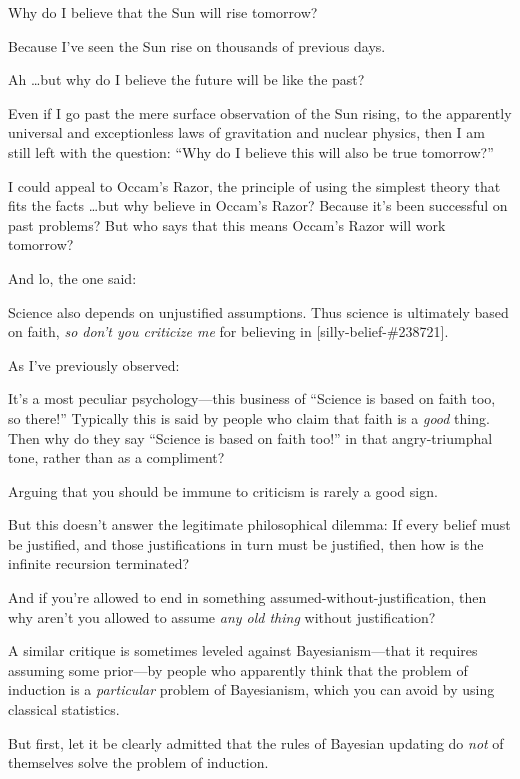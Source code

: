 {
 Why do I believe that the Sun will rise tomorrow? }

{
 Because I've seen the Sun rise on thousands of
previous days.}

{
 Ah \ldots but why do I believe the future will be like the past?}

{
 Even if I go past the mere surface observation of the Sun rising,
to the apparently universal and exceptionless laws of gravitation and
nuclear physics, then I am still left with the question:
``Why do I believe this will also be true
tomorrow?''}

{
 I could appeal to Occam's Razor, the principle of
using the simplest theory that fits the facts \ldots but why believe in
Occam's Razor? Because it's been
successful on past problems? But who says that this means
Occam's Razor will work tomorrow?}

{
 And lo, the one said:}

{
 Science also depends on unjustified assumptions. Thus science is
ultimately based on faith, \textit{so don't you
criticize me} for believing in [silly-belief-\#238721].}

{
 As I've previously observed:}

{
 It's a most peculiar psychology---this business of
``Science is based on faith too, so
there!'' Typically this is said by people who claim
that faith is a \textit{good} thing. Then why do they say
``Science is based on faith too!''
in that angry-triumphal tone, rather than as a compliment?}

{
 Arguing that you should be immune to criticism is rarely a good
sign.}

{
 But this doesn't answer the legitimate
philosophical dilemma: If every belief must be justified, and those
justifications in turn must be justified, then how is the infinite
recursion terminated?}

{
 And if you're allowed to end in something
assumed-without-justification, then why aren't you
allowed to assume \textit{any old thing} without justification?}

{
 A similar critique is sometimes leveled against Bayesianism---that
it requires assuming some prior---by people who apparently think that
the problem of induction is a \textit{particular} problem of
Bayesianism, which you can avoid by using classical statistics.}

{
 But first, let it be clearly admitted that the rules of Bayesian
updating do \textit{not} of themselves solve the problem of induction.}

